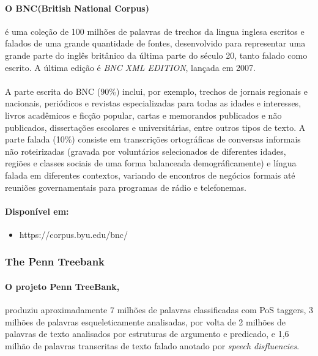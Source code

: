 \documentclass[a4paper, 10pt]{article}
\begin{document}
            	\paragraph{O BNC(British National Corpus)}
            	é uma coleção de 100 milhões de palavras de trechos da lingua inglesa escritos e falados de uma grande quantidade de fontes, desenvolvido para representar uma grande parte do inglês britânico da última parte do século 20, tanto falado como escrito. A última edição é \textit{BNC XML EDITION}, lançada em 2007.
                \paragraph{}A parte escrita do BNC (90\%)
                inclui, por exemplo, trechos de jornais regionais e nacionais, periódicos e revistas especializadas para todas as idades e interesses, livros acadêmicos e ficção popular, cartas e memorandos publicados e não publicados, dissertações escolares e universitárias, entre outros tipos de texto. A parte falada (10\%) consiste em transcrições ortográficas de conversas informais não roteirizadas (gravada por voluntários selecionados de diferentes idades, regiões e classes sociais de uma forma balanceada demográficamente) e língua falada em diferentes contextos, variando de encontros de negócios formais até reuniões governamentais para programas de rádio e telefonemas.
                \paragraph{Disponível em:}
                \begin{itemize}
                    \item https://corpus.byu.edu/bnc/
                \end{itemize}
           \subsubsection{The Penn Treebank} 
           		\paragraph{O projeto Penn TreeBank,} 
           		produziu aproximadamente 7 milhões de palavras classificadas com PoS taggers, 3 milhões de palavras esqueleticamente analisadas, por volta de 2 milhões de palavras de texto analisados por estruturas de argumento e predicado, e 1,6 milhão de palavras transcritas de texto falado anotado por \textit{speech disfluencies}. 
\end{document}
